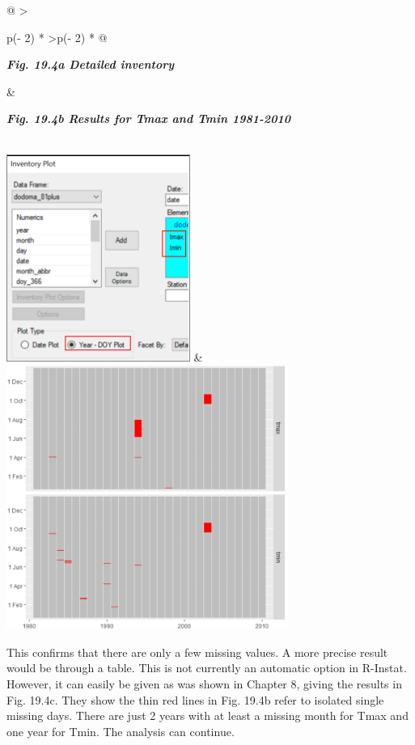 \documentclass[
  letterpaper,
  DIV=11,
  numbers=noendperiod]{scrreprt}
\begin{document}
\begin{longtable}[]{@{}
  >{\raggedright\arraybackslash}p{(\columnwidth - 2\tabcolsep) * }
  >{\raggedleft\arraybackslash}p{(\columnwidth - 2\tabcolsep) * }@{}}
\toprule\noalign{}
\begin{minipage}[b]{\linewidth}\raggedright
\textbf{\emph{Fig. 19.4a Detailed inventory}}
\end{minipage} & \begin{minipage}[b]{\linewidth}\raggedleft
\textbf{\emph{Fig. 19.4b Results for Tmax and Tmin 1981-2010}}
\end{minipage} \\
\midrule\noalign{}
\endhead
\bottomrule\noalign{}
\endlastfoot
\includegraphics[width=2.36233in,height=2.66681in]{figures/Fig19.4a.png}
&
\includegraphics[width=3.62922in,height=3.40702in]{figures/Fig19.4b.png} \\
\end{longtable}

This confirms that there are only a few missing values. A more precise
result would be through a table. This is not currently an automatic
option in R-Instat. However, it can easily be given as was shown in
Chapter 8, giving the results in Fig. 19.4c. They show the thin red
lines in Fig. 19.4b refer to isolated single missing days. There are
just 2 years with at least a missing month for Tmax and one year for
Tmin. The analysis can continue.
\end{document}
